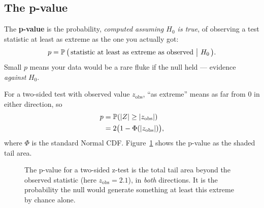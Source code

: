 \subsection{The p-value}

\begin{formalbox}
The \textbf{p-value} is the probability, \emph{computed assuming $H_0$ is true}, of
observing a test statistic at least as extreme as the one you actually got:
\[
  p = \P\big(\,\text{statistic at least as extreme as observed}\ \big|\ H_0\,\big).
\]
Small $p$ means your data would be a rare fluke if the null held --- evidence
\emph{against} $H_0$.
\end{formalbox}

For a two-sided test with observed value $z_{\text{obs}}$, ``as extreme'' means as far
from $0$ in either direction, so
\begin{align*}
  p &= \P(|Z| \ge |z_{\text{obs}}|) \\
    &= 2\big(1 - \Phi(|z_{\text{obs}}|)\big),
\end{align*}
where $\Phi$ is the standard Normal CDF. Figure~\ref{ch32:fig-pvalue} shows the p-value
as the shaded tail area.

\begin{figure}[H]
\centering
{}
\caption{The p-value for a two-sided z-test is the total tail area beyond the observed
statistic (here $z_{\text{obs}}=2.1$), in \emph{both} directions. It is the probability
the null would generate something at least this extreme by chance alone.}
\label{ch32:fig-pvalue}
\end{figure}

